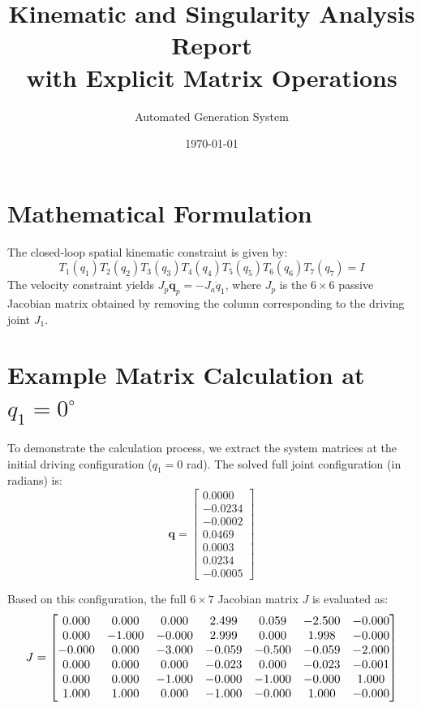 \documentclass[12pt,a4paper]{article}
\title{\textbf{Kinematic and Singularity Analysis Report \\ with Explicit Matrix Operations}}
\author{Automated Generation System}
\date{\today}
\begin{document}
\maketitle

\section{Mathematical Formulation}
The closed-loop spatial kinematic constraint is given by:
\begin{equation}
    T_1(q_1) T_2(q_2) T_3(q_3) T_4(q_4) T_5(q_5) T_6(q_6) T_7(q_7) = I
\end{equation}
The velocity constraint yields $J_p \dot{\mathbf{q}}_p = - J_a \dot{q}_1$, where $J_p$ is the $6 \times 6$ passive Jacobian matrix obtained by removing the column corresponding to the driving joint $J_1$.

\section{Example Matrix Calculation at $q_1 = 0^\circ$}
To demonstrate the calculation process, we extract the system matrices at the initial driving configuration ($q_1 = 0$ rad). The solved full joint configuration (in radians) is:
\begin{equation}
    \mathbf{q} = \begin{bmatrix} 0.0000 \\ -0.0234 \\ -0.0002 \\ 0.0469 \\ 0.0003 \\ 0.0234 \\ -0.0005 \end{bmatrix}
\end{equation}

Based on this configuration, the full $6 \times 7$ Jacobian matrix $J$ is evaluated as:
\begin{equation}
    \resizebox{0.95\textwidth}{!}{$ J = \begin{bmatrix}
  0.000 & 0.000 & 0.000 & 2.499 & 0.059 & -2.500 & -0.000 \\
  0.000 & -1.000 & -0.000 & 2.999 & 0.000 & 1.998 & -0.000 \\
  -0.000 & 0.000 & -3.000 & -0.059 & -0.500 & -0.059 & -2.000 \\
  0.000 & 0.000 & 0.000 & -0.023 & 0.000 & -0.023 & -0.001 \\
  0.000 & 0.000 & -1.000 & -0.000 & -1.000 & -0.000 & 1.000 \\
  1.000 & 1.000 & 0.000 & -1.000 & -0.000 & 1.000 & -0.000
\end{bmatrix} $}
\end{equation}
\end{document}
